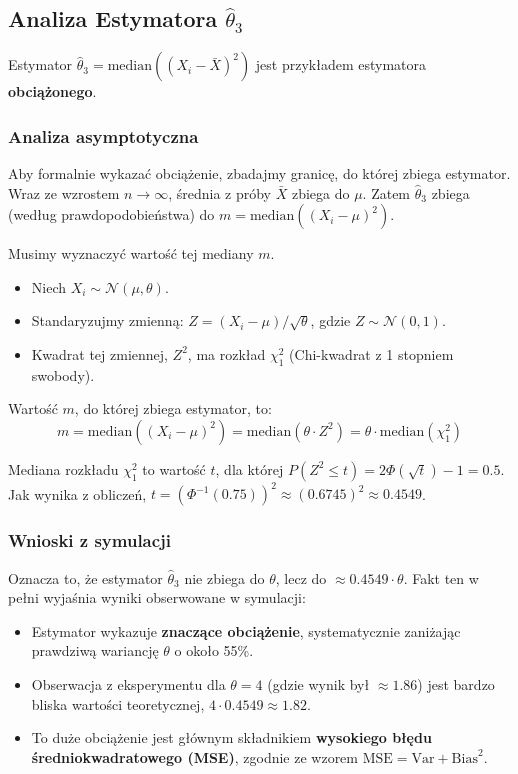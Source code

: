 \documentclass[a4paper,12pt]{article}
\begin{document}
\subsection*{Analiza Estymatora $\hat{\theta}_3$}

Estymator $\hat{\theta}_3 = \text{median}((X_i - \bar{X})^2)$ jest przykładem estymatora \textbf{obciążonego}.

\subsubsection*{Analiza asymptotyczna}

Aby formalnie wykazać obciążenie, zbadajmy granicę, do której zbiega estymator. Wraz ze wzrostem $n \to \infty$, średnia z próby $\bar{X}$ zbiega do $\mu$. Zatem $\hat{\theta}_3$ zbiega (według prawdopodobieństwa) do $m = \text{median}((X_i - \mu)^2)$.

Musimy wyznaczyć wartość tej mediany $m$.
\begin{itemize}
    \item Niech $X_i \sim \mathcal{N}(\mu, \theta)$.
    \item Standaryzujmy zmienną: $Z = (X_i - \mu) / \sqrt{\theta}$, gdzie $Z \sim \mathcal{N}(0, 1)$.
    \item Kwadrat tej zmiennej, $Z^2$, ma rozkład $\chi^2_1$ (Chi-kwadrat z 1 stopniem swobody).
\end{itemize}
Wartość $m$, do której zbiega estymator, to:
\[ m = \text{median}((X_i - \mu)^2) = \text{median}(\theta \cdot Z^2) = \theta \cdot \text{median}(\chi^2_1) \]

Mediana rozkładu $\chi^2_1$ to wartość $t$, dla której $P(Z^2 \le t) = 2\Phi(\sqrt{t}) - 1 = 0.5$. Jak wynika z obliczeń, $t = (\Phi^{-1}(0.75))^2 \approx (0.6745)^2 \approx \mathbf{0.4549}$.

\subsubsection*{Wnioski z symulacji}

Oznacza to, że estymator $\hat{\theta}_3$ nie zbiega do $\theta$, lecz do $\approx 0.4549 \cdot \theta$.
Fakt ten w pełni wyjaśnia wyniki obserwowane w symulacji:
\begin{itemize}
    \item Estymator wykazuje \textbf{znaczące obciążenie}, systematycznie zaniżając prawdziwą wariancję $\theta$ o około 55\%.
    \item Obserwacja z eksperymentu dla $\theta=4$ (gdzie wynik był $\approx 1.86$) jest bardzo bliska wartości teoretycznej, $4 \cdot 0.4549 \approx 1.82$.
    \item To duże obciążenie jest głównym składnikiem \textbf{wysokiego błędu średniokwadratowego (MSE)}, zgodnie ze wzorem $\text{MSE} = \text{Var} + \text{Bias}^2$.
\end{itemize}
\end{document}
